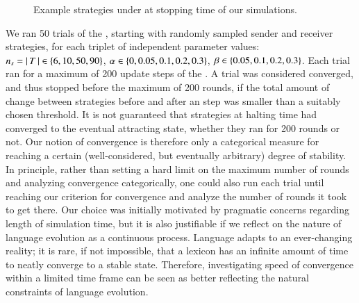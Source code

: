 \documentclass[fleqn,reqno,10pt]{article}
\newcommand{\rdd}{\acro{rdd}} %
\newcommand{\impairment}{\ensuremath{\alpha}} %
\newcommand{\toler}{\ensuremath{\beta}} %
\newcommand{\ns}{\ensuremath{n_s}} %
\begin{document}
\begin{figure}


  \caption{Example strategies under \rdd at stopping time of our simulations.}
  \label{fig:example_strats}
\end{figure}

We ran 50 trials of the \rdd, starting with randomly sampled sender
and receiver strategies, for each triplet of independent parameter
values: $\ns = \card{T} \in \set{6, 10, 50, 90}$, $\impairment \in
\set{0, 0.05, 0.1, 0.2, 0.3}$, $\toler \in \set{0.05, 0.1, 0.2,
  0.3}$. Each trial ran for a maximum of 200 update steps of the
\rdd. A trial was considered converged, and thus stopped before the maximum
of 200 rounds, if the total amount of change between strategies before
and after an \rdd step was smaller than a suitably chosen
threshold. It is not guaranteed that strategies at halting time had
converged to the eventual attracting state, whether they ran for 200
rounds or not. Our notion of convergence is therefore only a
categorical measure for reaching a certain (well-considered, but
eventually arbitrary) degree of stability. In principle, rather than
setting a hard limit on the maximum number of rounds and analyzing
convergence categorically, one could also run each trial until reaching
our criterion for convergence and analyze the number of rounds it took to get there.
Our choice was initially motivated by pragmatic concerns regarding length of
simulation time, but it is also justifiable if we reflect on the
nature of language evolution as a continuous process.
Language adapts to an ever-changing reality; it is rare, if not impossible,
that a lexicon has an infinite amount of time to neatly converge to a stable
state. Therefore, investigating speed of convergence within a limited
time frame can be seen as better reflecting the natural constraints of
language evolution.
\end{document}
